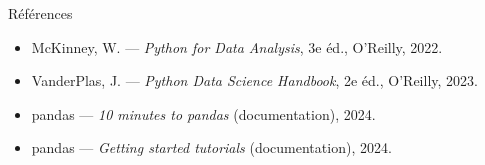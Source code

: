 \documentclass[aspectratio=169,11pt]{beamer}
\begin{document}
\begin{frame}{Références}
\begin{itemize}\small
  \item McKinney, W. — \emph{Python for Data Analysis}, 3e éd., O'Reilly, 2022.
  \item VanderPlas, J. — \emph{Python Data Science Handbook}, 2e éd., O'Reilly, 2023.
  \item pandas — \emph{10 minutes to pandas} (documentation), 2024.
  \item pandas — \emph{Getting started tutorials} (documentation), 2024.
\end{itemize}
\end{frame}
\end{document}
